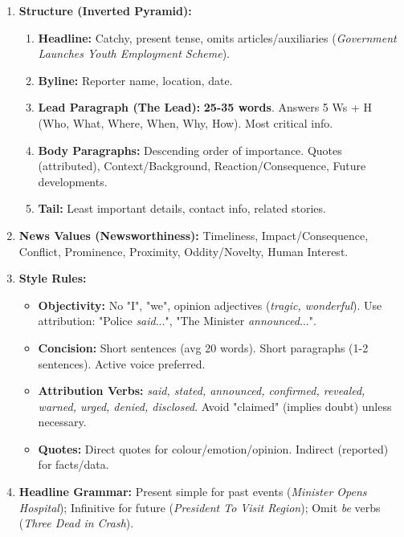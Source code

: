 \documentclass[11pt]{article}
\newcommand{\cle}[1]{{\popxbold\color{popdark}#1}}
\begin{document}
\begin{methode}
\begin{enumerate}
    \item \textbf{Structure (Inverted Pyramid):}
    \begin{enumerate}
        \item \textbf{Headline:} Catchy, present tense, omits articles/auxiliaries (\textit{Government Launches Youth Employment Scheme}).
        \item \textbf{Byline:} Reporter name, location, date.
        \item \textbf{Lead Paragraph (The Lead):} \textbf{25-35 words}. Answers \cle{5 Ws + H} (Who, What, Where, When, Why, How). Most critical info.
        \item \textbf{Body Paragraphs:} Descending order of importance. \cle{Quotes} (attributed), \cle{Context/Background}, \cle{Reaction/Consequence}, \cle{Future developments}.
        \item \textbf{Tail:} Least important details, contact info, related stories.
    \end{enumerate}
    \item \textbf{News Values (Newsworthiness):} \cle{Timeliness}, \cle{Impact/Consequence}, \cle{Conflict}, \cle{Prominence}, \cle{Proximity}, \cle{Oddity/Novelty}, \cle{Human Interest}.
    \item \textbf{Style Rules:}
    \begin{itemize}
        \item \textbf{Objectivity:} No "I", "we", opinion adjectives (\textit{tragic, wonderful}). Use \cle{attribution}: "Police \textit{said}...", "The Minister \textit{announced}...".
        \item \textbf{Concision:} Short sentences (avg 20 words). Short paragraphs (1-2 sentences). Active voice preferred.
        \item \textbf{Attribution Verbs:} \textit{said, stated, announced, confirmed, revealed, warned, urged, denied, disclosed}. Avoid "claimed" (implies doubt) unless necessary.
        \item \textbf{Quotes:} Direct quotes for colour/emotion/opinion. Indirect (reported) for facts/data.
    \end{itemize}
    \item \textbf{Headline Grammar:} Present simple for past events (\textit{Minister Opens Hospital}); Infinitive for future (\textit{President To Visit Region}); Omit \textit{be} verbs (\textit{Three Dead in Crash}).
\end{enumerate}
\end{methode}
\end{document}

